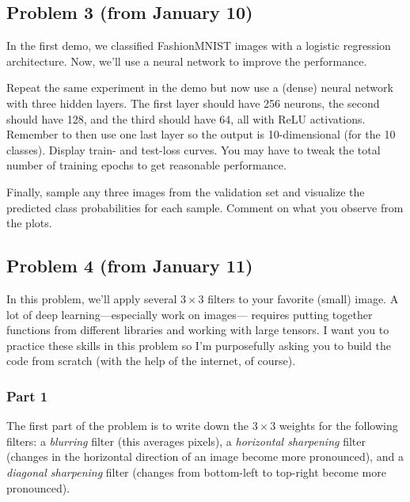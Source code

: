 \documentclass{article}
\begin{document}
%

\subsection*{Problem 3 (from January 10)}

In the first demo, we classified FashionMNIST
images with a logistic regression architecture.
Now, we'll use a neural network to improve the performance.

Repeat the same experiment in the demo 
but now use a (dense) neural network with three hidden layers.
The first layer should have 256 neurons, the second should
have 128, and the third should have 64, all with ReLU activations.
Remember to then use one last layer so the output is 10-dimensional
(for the 10 classes).
Display train- and test-loss curves.
You may have to tweak the total number of training epochs to get
reasonable performance.

Finally, sample any three images from the validation set and
visualize the predicted class probabilities for each sample.
Comment on what you observe from the plots.

%

\subsection*{Problem 4 (from January 11)}
In this problem, we'll apply several $3 \times 3$ filters
to your favorite (small) image.
A lot of deep learning---especially work on images---
requires putting together functions from different libraries and 
working with large tensors.
I want you to practice these skills in this problem so I'm purposefully
asking you to build the code from scratch 
(with the help of the internet, of course).

\subsubsection*{Part 1}
The first part of the problem
is to write down the $3 \times 3$ weights for the following
filters: a \textit{blurring} filter (this averages pixels),
a \textit{horizontal sharpening} filter (changes in the horizontal
direction of an image become more pronounced),
and a \textit{diagonal sharpening} filter (changes from bottom-left
to top-right become more pronounced).
\end{document}

